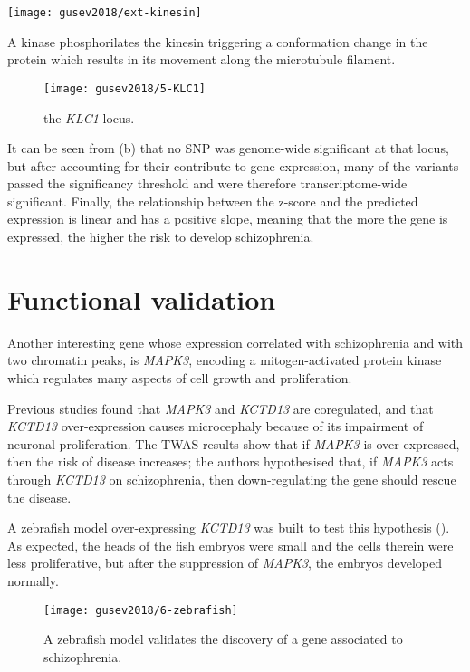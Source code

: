 \documentclass[../main.tex]{subfiles}
\begin{document}
\begin{marginfigure}[-4.5cm]
	\texttt{[image: gusev2018/ext-kinesin]}
	\caption{A kinase phosphorilates the kinesin triggering a 
conformation change in the protein which results in its movement along 
the microtubule filament.}
\end{marginfigure}

\begin{figure}
	\texttt{[image: gusev2018/5-KLC1]}
	\caption{the \textit{KLC1} locus.}
\end{figure}

It can be seen from (b) that no SNP was genome-wide significant at that 
locus, but after accounting for their contribute to gene expression, 
many of the variants passed the significancy threshold and were 
therefore transcriptome-wide significant. Finally, the relationship 
between the z-score and the predicted expression is linear and has a 
positive slope, meaning that the more the gene is expressed, the higher 
the risk to develop schizophrenia.

\section{Functional validation}

Another interesting gene whose expression correlated with schizophrenia 
and with two chromatin peaks, is \textit{MAPK3}, encoding a 
mitogen-activated protein kinase which regulates many aspects of cell 
growth and proliferation. 

Previous studies found that \textit{MAPK3} and \textit{KCTD13} are 
coregulated, and that \textit{KCTD13} over-expression causes 
microcephaly because of its impairment of neuronal proliferation. The 
TWAS results show that if \textit{MAPK3} is over-expressed, then the 
risk of disease increases; the authors hypothesised that, if 
\textit{MAPK3} acts through \textit{KCTD13} on schizophrenia, then 
down-regulating the gene should rescue the disease.

A zebrafish model over-expressing \textit{KCTD13} was built to test this 
hypothesis (). As expected, the heads of the fish 
embryos were small and the cells therein were less proliferative, but 
after the suppression of \textit{MAPK3}, the embryos developed normally.

\begin{figure}
	\texttt{[image: gusev2018/6-zebrafish]}
	\caption{A zebrafish model validates the discovery of a gene 
associated to schizophrenia.}
\end{figure}
\end{document}
